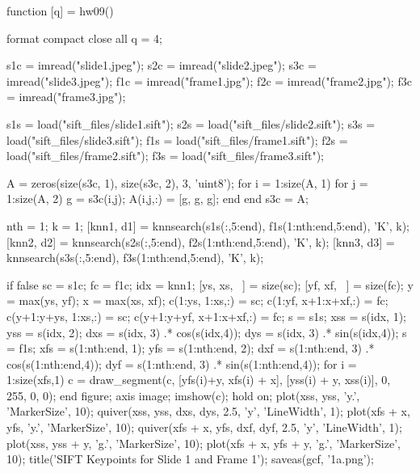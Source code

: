 function [q] = hw09()
% 

format compact
close all
q = 4;



s1c = imread("slide1.jpeg");
s2c = imread("slide2.jpeg");
s3c = imread("slide3.jpeg");
f1c = imread("frame1.jpg");
f2c = imread("frame2.jpg");
f3c = imread("frame3.jpg");


s1s = load("sift_files/slide1.sift");
s2s = load("sift_files/slide2.sift");
s3s = load("sift_files/slide3.sift");
f1s = load("sift_files/frame1.sift");
f2s = load("sift_files/frame2.sift");
f3s = load("sift_files/frame3.sift");


A = zeros(size(s3c, 1), size(s3c, 2), 3, 'uint8');
for i = 1:size(A, 1)
    for j = 1:size(A, 2)
        g = s3c(i,j);
        A(i,j,:) = [g, g, g];
    end
end
s3c = A;

nth = 1;
k = 1;
[knn1, d1] = knnsearch(s1s(:,5:end), f1s(1:nth:end,5:end), 'K', k);
[knn2, d2] = knnsearch(s2s(:,5:end), f2s(1:nth:end,5:end), 'K', k);
[knn3, d3] = knnsearch(s3s(:,5:end), f3s(1:nth:end,5:end), 'K', k);

if false
sc = s1c;
fc = f1c;
idx = knn1;
[ys, xs, ~] = size(sc);
[yf, xf, ~] = size(fc);
y = max(ys, yf);
x = max(xs, xf);
c(1:ys, 1:xs,:) = sc;
c(1:yf, x+1:x+xf,:) = fc;
c(y+1:y+ys, 1:xs,:) = sc;
c(y+1:y+yf, x+1:x+xf,:) = fc;
s = s1s;
xss = s(idx, 1);
yss = s(idx, 2);
dxs = s(idx, 3) .* cos(s(idx,4));
dys = s(idx, 3) .* sin(s(idx,4));
s = f1s;
xfs = s(1:nth:end, 1);
yfs = s(1:nth:end, 2);
dxf = s(1:nth:end, 3) .* cos(s(1:nth:end,4));
dyf = s(1:nth:end, 3) .* sin(s(1:nth:end,4));
for i = 1:size(xfs,1)
    c = draw_segment(c, [yfs(i)+y, xfs(i) + x], [yss(i) + y, xss(i)], 0, 255, 0, 0);
end
figure;
axis image;
imshow(c);
hold on;
plot(xss, yss, 'y.', 'MarkerSize', 10);
quiver(xss, yss, dxs, dys, 2.5, 'y', 'LineWidth', 1);
plot(xfs + x, yfs, 'y.', 'MarkerSize', 10);
quiver(xfs + x, yfs, dxf, dyf, 2.5, 'y', 'LineWidth', 1);
plot(xss, yss + y, 'g.', 'MarkerSize', 10);
plot(xfs + x, yfs + y, 'g.', 'MarkerSize', 10);
title('SIFT Keypoints for Slide 1 and Frame 1');
saveas(gcf, '1a.png');

